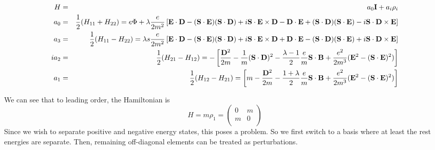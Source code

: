 \begin{eqnarray*}
H &=&	a_0 {\bf I} + a_i \rho_i \\
a_0  	&=& 
 \frac{1}{2}(H_{11}+H_{22}) =
			e\Phi + 
				\lambda \frac{e}{2m^2} 
				\left [ 
					\mathbf{E} \cdot \mathbf{D} - (\mathbf{S} \cdot \mathbf{E})( \mathbf{S} \cdot \mathbf{D}) + i \mathbf{S} \cdot \mathbf{E} \times \mathbf{D}
					- \mathbf{D} \cdot \mathbf{E} + (\mathbf{S} \cdot \mathbf{D}) (\mathbf{S} \cdot \mathbf{E}) - i \mathbf{S} \cdot \mathbf{D} \times \mathbf{E} 
				\right ]\\
a_3 	&=&
 \frac{1}{2}(H_{11}-H_{22}) =
				\lambda s\frac{e}{2m^2} 	\left [ 
					\mathbf{E} \cdot \mathbf{D} - (\mathbf{S} \cdot \mathbf{E})( \mathbf{S} \cdot \mathbf{D}) + i \mathbf{S} \cdot \mathbf{E} \times \mathbf{D}
					+ \mathbf{D} \cdot \mathbf{E} - (\mathbf{S} \cdot \mathbf{D}) (\mathbf{S} \cdot \mathbf{E}) + i \mathbf{S} \cdot \mathbf{D} \times \mathbf{E} 
				\right ]\\
ia_2	&=& 
 \frac{1}{2}(H_{21}-H_{12}) =
				-\left [	
					\frac{\mathbf{D}^2}{2m} - \frac{1}{m} (\mathbf{S} \cdot \mathbf{D})^2 
					-\frac{\lambda-1}{2} \frac{e}{m} \mathbf{S} \cdot \mathbf{B}
					+ \frac{e^2}{2m^3}(\mathbf{E}^2 -(\mathbf{S}\cdot\mathbf{E})^2)
				\right ]	\\
a_1		&=&	
 \frac{1}{2}(H_{12}-H_{21}) =
				\left [
					m - \frac{\mathbf{D}^2}{2m} - \frac{1+\lambda}{2}\frac{e}{m}\mathbf{S} \cdot \mathbf{B}
					+ \frac{e^2}{2m^3}(\mathbf{E}^2 -(\mathbf{S}\cdot\mathbf{E})^2)
				\right ]
\end{eqnarray*}

We can see that to leading order, the Hamiltonian is
\begin{equation*}
H = m \rho_1 = 
\begin{pmatrix}
0	&	m \\
m	&	0	\\
\end{pmatrix}
\end{equation*}
Since we wish to separate positive and negative energy states, this poses a problem.  So we first switch to a basis where at least the rest energies are separate.  Then, remaining off-diagonal elements can be treated as perturbations.

